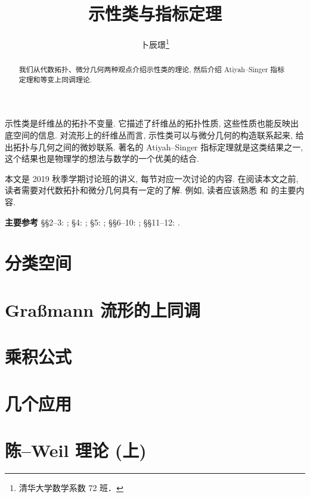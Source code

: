 \documentclass[twoside]{article}
\begin{document}
\title{示性类与指标定理}
\author{卜辰璟\footnote{清华大学数学系数 72 班．}}

\begin{abstract}
    我们从代数拓扑、微分几何两种观点介绍示性类的理论, 
    然后介绍 Atiyah--Singer 指标定理和等变上同调理论.
\end{abstract}

示性类是纤维丛的拓扑不变量. 
它描述了纤维丛的拓扑性质, 这些性质也能反映出底空间的信息.
对流形上的纤维丛而言, 示性类可以与微分几何的构造联系起来, 
给出拓扑与几何之间的微妙联系. 
著名的 Atiyah--Singer 指标定理就是这类结果之一,
这个结果也是物理学的想法与数学的一个优美的结合.

本文是 2019 秋季学期讨论班的讲义, 每节对应一次讨论的内容. 
在阅读本文之前, 读者需要对代数拓扑和微分几何具有一定的了解.
例如, 读者应该熟悉 \cite{may} 和 \cite{do-carmo} 的主要内容.

\tableofcontents

\bigskip
\begin{trivlist}
    \item [\textbf{主要参考\enspace}]
        \S\S2--3: \cite{cohen};
        \S4: \cite{milnor-stasheff};
        \S5: \cite{rahman};
        \S\S6--10: \cite{bgv};
        \S\S11--12: \cite{libine}.
\end{trivlist}

\clearpage

\section{分类空间} \label{sect-1}



\section{Graßmann 流形的上同调} \label{sect-2}



\section{乘积公式} \label{sect-3}



\section{几个应用} \label{sect-4}



\section{陈--Weil 理论 (上)} \label{sect-5}
\end{document}
